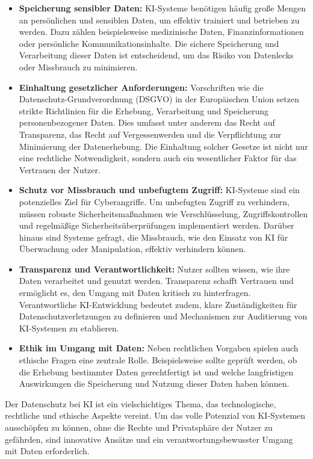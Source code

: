 \documentclass[a4paper,12pt]{article}
\begin{document}
\begin{itemize} \item \textbf{Speicherung sensibler Daten:}
KI-Systeme benötigen häufig große Mengen an persönlichen und sensiblen Daten, um effektiv trainiert und betrieben zu werden. Dazu zählen beispielsweise medizinische Daten, Finanzinformationen oder persönliche Kommunikationsinhalte. Die sichere Speicherung und Verarbeitung dieser Daten ist entscheidend, um das Risiko von Datenlecks oder Missbrauch zu minimieren.

\item \textbf{Einhaltung gesetzlicher Anforderungen:}  
Vorschriften wie die Datenschutz-Grundverordnung (DSGVO) in der Europäischen Union setzen strikte Richtlinien für die Erhebung, Verarbeitung und Speicherung personenbezogener Daten. Dies umfasst unter anderem das Recht auf Transparenz, das Recht auf Vergessenwerden und die Verpflichtung zur Minimierung der Datenerhebung. Die Einhaltung solcher Gesetze ist nicht nur eine rechtliche Notwendigkeit, sondern auch ein wesentlicher Faktor für das Vertrauen der Nutzer.

\item \textbf{Schutz vor Missbrauch und unbefugtem Zugriff:}  
KI-Systeme sind ein potenzielles Ziel für Cyberangriffe. Um unbefugten Zugriff zu verhindern, müssen robuste Sicherheitsmaßnahmen wie Verschlüsselung, Zugriffskontrollen und regelmäßige Sicherheitsüberprüfungen implementiert werden. Darüber hinaus sind Systeme gefragt, die Missbrauch, wie den Einsatz von KI für Überwachung oder Manipulation, effektiv verhindern können.

\item \textbf{Transparenz und Verantwortlichkeit:}  
Nutzer sollten wissen, wie ihre Daten verarbeitet und genutzt werden. Transparenz schafft Vertrauen und ermöglicht es, den Umgang mit Daten kritisch zu hinterfragen. Verantwortliche KI-Entwicklung bedeutet zudem, klare Zuständigkeiten für Datenschutzverletzungen zu definieren und Mechanismen zur Auditierung von KI-Systemen zu etablieren.

\item \textbf{Ethik im Umgang mit Daten:}  
Neben rechtlichen Vorgaben spielen auch ethische Fragen eine zentrale Rolle. Beispielsweise sollte geprüft werden, ob die Erhebung bestimmter Daten gerechtfertigt ist und welche langfristigen Auswirkungen die Speicherung und Nutzung dieser Daten haben können.
\end{itemize}

Der Datenschutz bei KI ist ein vielschichtiges Thema, das technologische, rechtliche und ethische Aspekte vereint. Um das volle Potenzial von KI-Systemen ausschöpfen zu können, ohne die Rechte und Privatsphäre der Nutzer zu gefährden, sind innovative Ansätze und ein verantwortungsbewusster Umgang mit Daten erforderlich.
\end{document}

